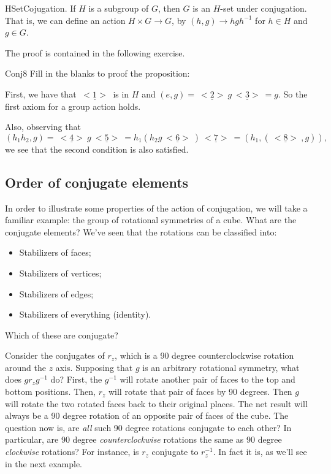 \begin{prop}{HSetCojugation}. If $H$ is a subgroup of $G$, then $G$ is an $H$-set under conjugation.  That is, we can define an action $H \times G\rightarrow G$, by $(h, g) \rightarrow hgh^{-1}$ for $h\in H$ and $g\in G$. 
\end{prop}
The proof is contained in the following exercise.

\begin{exercise}{Conj8}
Fill in the blanks to proof the proposition:

\noindent
First, we have that $\underline{~<1>~}$ is in  $H$ and $(e, g) = \underline{~<2>~}g\underline{~<3>~} = g$.
So the first axiom for a group action holds. 

Also, observing that
\[(h_1h_2,g) = \underline{~<4>~}g\underline{~<5>~}
= h_1(h_2g\underline{~<6>~} )\underline{~<7>~}
= (h_1, (\underline{~<8>~}, g)),\]
we see that the second condition is also satisfied.
\end{exercise}


%

\subsection*{Order of conjugate elements}

In order to illustrate some properties of the action of conjugation, we will take a familiar example: the group of rotational symmetries of a cube.
What are the conjugate elements?
We've seen that the rotations can be classified into:
\begin{itemize}
\item
Stabilizers of faces;
\item
Stabilizers of vertices;
\item
Stabilizers of edges;
\item
Stabilizers of everything (identity).
\end{itemize}
Which of these are conjugate? 


Consider the conjugates of $r_z$, which is a 90 degree counterclockwise rotation around the $z$ axis. Supposing that $g$ is an arbitrary rotational symmetry, what does $g r_z g^{-1}$ do? First, the $g^{-1}$ will rotate another pair of faces to the top and bottom positions. Then, $r_z$ will rotate that pair of faces by 90 degrees. Then $g$ will rotate the two rotated faces back to their original places. The net result will always be a 90 degree rotation of an opposite pair of faces of the cube. 
The question now is, are \emph{all} such 90 degree rotations conjugate to each other? In particular, are 90 degree \emph{counterclockwise} rotations the same as 90 degree \emph{clockwise} rotations? For instance, is $r_z$ conjugate to $r_z^{-1}$.  In fact it is, as we'll see in the next example.

